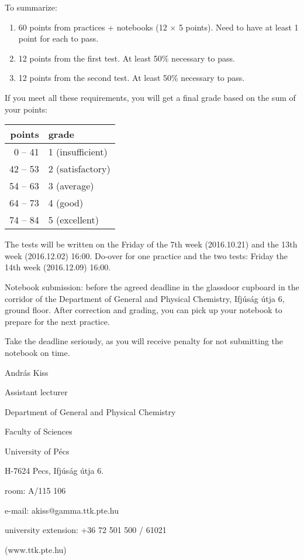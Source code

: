 \documentclass{article}
\begin{document}
To summarize: 

\begin{enumerate}
\item 60 points from practices + notebooks (12 $\times$ 5 points). Need to have at least 1 point for each to pass.
\item 12 points from the first test. At least 50\% necessary to pass.
\item 12 points from the second test. At least 50\% necessary to pass. 
\end{enumerate}

If you meet all these requirements, you will get a final grade based on the sum of your points:

\begin{center}
\begin{tabular}{|r|l|}
\hline
points & grade \\
\hline
0 -- 41 & 1 (insufficient) \\
\hline
42 -- 53 & 2 (satisfactory) \\
\hline
54 -- 63 & 3 (average) \\
\hline
64 -- 73 & 4 (good) \\
\hline
74 -- 84 & 5 (excellent) \\
\hline
\end{tabular}
\end{center}

The tests will be written on the Friday of the 7th week (2016.10.21) and the 13th week (2016.12.02) 16:00. Do-over for one practice and the two tests: Friday the 14th week (2016.12.09) 16:00. 

Notebook submission: before the agreed deadline in the glassdoor cupboard in the corridor of the Department of General and Physical Chemistry, Ifjúság útja 6, ground floor. After correction and grading, you can pick up your notebook to prepare for the next practice.

Take the deadline seriously, as you will receive penalty for not submitting the notebook on time.

\vspace{10mm}

András Kiss

Assistant lecturer

Department of General and Physical Chemistry

Faculty of Sciences

University of Pécs

H-7624 Pecs, Ifjúság útja 6.

room: A/115 106

e-mail: akiss@gamma.ttk.pte.hu

university extension: +36 72 501 500 / 61021

(www.ttk.pte.hu)
\end{document}
